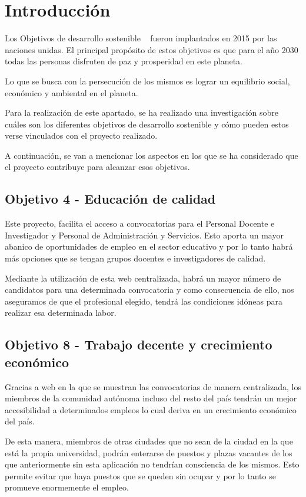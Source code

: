
\section{Introducción}
Los Objetivos de desarrollo sostenible ~\cite{ods:latex} fueron implantados en 2015 por las naciones unidas. El principal propósito de estos objetivos es que para el año 2030 todas las personas disfruten de paz y prosperidad en este planeta.

Lo que se busca con la persecución de los mismos es lograr un equilibrio social, económico y ambiental en el planeta.

Para la realización de este apartado, se ha realizado una investigación sobre cuáles son los diferentes objetivos de desarrollo sostenible y cómo pueden estos verse vinculados con el proyecto realizado.

A continuación, se van a mencionar los aspectos en los que se ha considerado que el proyecto contribuye para alcanzar esos objetivos.

\subsection{Objetivo 4 - Educación de calidad}
Este proyecto, facilita el acceso a convocatorias para el Personal Docente e Investigador y Personal de Administración y Servicios. Esto aporta un mayor abanico de oportunidades de empleo en el sector educativo y por lo tanto habrá más opciones que se tengan grupos docentes e investigadores de calidad.

Mediante la utilización de esta web centralizada, habrá un mayor número de candidatos para una determinada convocatoria y como consecuencia de ello, nos aseguramos de que el profesional elegido, tendrá las condiciones idóneas para realizar esa determinada labor.


\subsection{Objetivo 8 - Trabajo decente y crecimiento económico}

Gracias a web en la que se muestran las convocatorias de manera centralizada, los miembros de la comunidad autónoma incluso del resto del país tendrán un mejor accesibilidad a determinados empleos lo cual deriva en un crecimiento económico del país.

De esta manera, miembros de otras ciudades que no sean de la ciudad en la que está la propia universidad, podrán enterarse de puestos y plazas vacantes de los que anteriormente sin esta aplicación no tendrían consciencia de los mismos. Esto permite evitar que haya puestos que se queden sin ocupar y por lo tanto se promueve enormemente el empleo.

